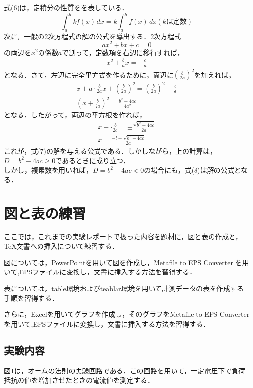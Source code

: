 \documentclass[titlepage]{jarticle}
\begin{document}
式(6)は，定積分の性質をを表している．
\begin{equation}
\int_{a}^{b} kf(x)\,dx = k\int_{a}^{b} f(x)\,dx (kは定数)
\end{equation}
次に，一般の2次方程式の解の公式を導出する．2次方程式
\begin{equation}
ax^{2} + bx + c = 0
\end{equation}
の両辺を$x^{2}$の係数$a$で割って，定数項を右辺に移行すれば，
\begin{eqnarray}
x^{2} + \frac{b}{a}x = -\frac{c}{a}\nonumber
\end{eqnarray}
となる．さて，左辺に完全平方式を作るために，両辺に$\displaystyle \left(\frac{b}{2a}\right)^{2}$を加えれば，
\begin{eqnarray}
x + a {\cdot}\frac{b}{2a}x + \left(\frac{b}{2a}\right)^{2} = \left(\frac{b}{2a}\right)^{2} -\frac{c}{a}\nonumber\\
\left(x + \frac{b}{2a}\right)^{2} = \frac{b^2 - 4ac}{4a^{2}}
\end{eqnarray}
となる．したがって，両辺の平方根を作れば，
\begin{eqnarray}
x + {\cdot}\frac{b}{2a} = {\pm}\frac{\sqrt{b^{2}-4ac}}{2a}\nonumber\\
x = \frac{-b {\pm}\sqrt{b^{2}-4ac}}{2a}
\end{eqnarray}
これが，式(7)の解を与える公式である．しかしながら，上の計算は，$D = b^{2} -4ac {\geq} 0$であるときに成り立つ．\\
しかし，複素数を用いれば，$D = b^{2} -4ac < 0$の場合にも，式(8)は解の公式となる．

\section{図と表の練習}
ここでは，これまでの実験レポートで扱った内容を題材に，図と表の作成と，{\TeX}文書への挿入について練習する．

図については，PowerPointを用いて図を作成し，Metafile to EPS Converter を用いて,EPSファイルに変換し，文書に挿入する方法を習得する．

表については，table環境およびteablar環境を用いて計測データの表を作成する手順を習得する．

さらに，Excelを用いてグラフを作成し，そのグラフをMetafile to EPS Converter を用いて,EPSファイルに変換し，文書に挿入する方法を習得する．

\subsection{実験内容}
図1は，オームの法則の実験回路である．この回路を用いて，一定電圧下で負荷抵抗の値を増加させたときの電流値を測定する．
\end{document}
